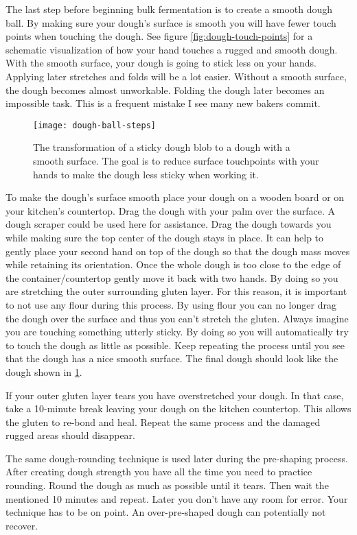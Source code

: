 The last step before beginning bulk fermentation is to
create a smooth dough ball. By making sure your dough's surface is
smooth you will have fewer touch points when touching the dough.
See figure \ref{fig:dough-touch-points} for a schematic visualization
of how your hand touches a rugged and smooth dough.
With the smooth surface, your dough is going to stick less on your hands. Applying
later stretches and folds will be a lot easier. Without a smooth
surface, the dough becomes almost unworkable. Folding the dough later
becomes an impossible task. This is a frequent mistake I see many
new bakers commit.

\begin{figure}[!htb]
  \texttt{[image: dough-ball-steps]}
  \caption{The transformation of a sticky dough blob to a dough
  with a smooth surface. The goal is to reduce surface touchpoints
  with your hands to make the dough less sticky when working it.
  }
  \label{fig:dough-ball-steps}
\end{figure}


To make the dough's surface smooth place your dough on a wooden board or
on your kitchen's countertop. Drag the dough with your palm over the surface.
A dough scraper could be used here for assistance.
Drag the dough towards you while making sure the top center of the dough stays in place.
It can help to gently place your second hand on top of the dough so that
the dough mass moves while retaining its orientation. Once the whole dough
is too close to the edge of the container/countertop gently move it back
with two hands. By doing so you are stretching the outer surrounding gluten layer.
For this reason, it is important to not use any flour during this process.
By using flour you can no longer drag the dough over the surface and thus
you can't stretch the gluten. Always imagine you are touching something utterly sticky.
By doing so you will automatically try to touch the dough as little
as possible. Keep repeating the process until you see that the dough
has a nice smooth surface. The final dough should look like the dough
shown in \ref{fig:dough-ball-steps}.

If your outer gluten layer tears you have overstretched your dough. In
that case, take a 10-minute break leaving your dough on the kitchen countertop.
This allows the gluten to re-bond and heal. Repeat the same process
and the damaged rugged areas should disappear.

The same dough-rounding technique is used later during
the pre-shaping process. After creating dough strength you
have all the time you need to practice rounding. Round the dough
as much as possible until it tears. Then wait the mentioned 10 minutes and repeat.
Later you don't have any room for error. Your technique has to be on point.
An over-pre-shaped dough can potentially not recover.


